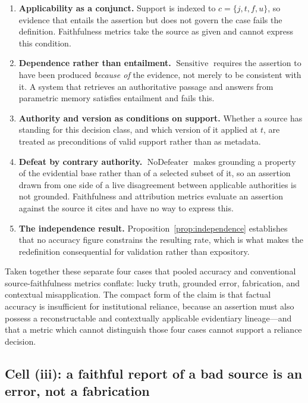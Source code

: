 \documentclass[11pt]{article}
\newcommand{\Sensitive}{\operatorname{Sensitive}}
\newcommand{\NoDefeater}{\operatorname{NoDefeater}}
\theoremstyle{plain}
\theoremstyle{definition}
\begin{document}
\begin{enumerate}
  \item \textbf{Applicability as a conjunct.} Support is indexed to
        $c = \{j, t, f, u\}$, so evidence that entails the assertion but does not
        govern the case fails the definition. Faithfulness metrics take the source as
        given and cannot express this condition.
  \item \textbf{Dependence rather than entailment.} $\Sensitive$ requires the
        assertion to have been produced \emph{because of} the evidence, not merely to
        be consistent with it. A system that retrieves an authoritative passage and
        answers from parametric memory satisfies entailment and fails this.
  \item \textbf{Authority and version as conditions on support.} Whether a source has
        standing for this decision class, and which version of it applied at $t$, are
        treated as preconditions of valid support rather than as metadata.
  \item \textbf{Defeat by contrary authority.} $\NoDefeater$ makes grounding a
        property of the evidential base rather than of a selected subset of it, so an
        assertion drawn from one side of a live disagreement between applicable
        authorities is not grounded. Faithfulness and attribution metrics evaluate an
        assertion against the source it cites and have no way to express this.
  \item \textbf{The independence result.} Proposition~\ref{prop:independence}
        establishes that no accuracy figure constrains the resulting rate, which is
        what makes the redefinition consequential for validation rather than
        expository.
\end{enumerate}

Taken together these separate four cases that pooled accuracy and conventional
source-faithfulness metrics conflate: lucky truth, grounded error, fabrication, and
contextual misapplication. The compact form of the claim is that factual accuracy is
insufficient for institutional reliance, because an assertion must also possess a
reconstructable and contextually applicable evidentiary lineage---and that a metric
which cannot distinguish those four cases cannot support a reliance decision.


\subsection{Cell (iii): a faithful report of a bad source is an error, not a fabrication}
\label{sec:cell-iii}
\end{document}
